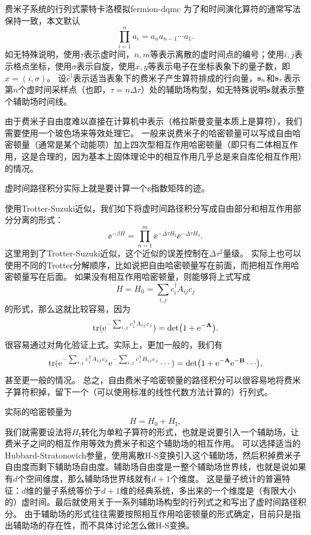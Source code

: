 \begin{back}{费米子系统的行列式蒙特卡洛模拟}{fermion-dqmc}
    为了和时间演化算符的通常写法保持一致，本文默认
    \[
        \prod_{i=1}^n a_i = a_n a_{n-1} \cdots a_1.
    \]
    如无特殊说明，使用$\tau$表示虚时间，$n, m$等表示离散的虚时间点的编号；使用$i, j$表示格点坐标，使用$\sigma$表示自旋，使用$x, y$等表示电子在坐标表象下的量子数，即$x=(i, \sigma)$。
    设$\hat{c}^\dagger$表示适当表象下的费米子产生算符排成的行向量，$\vb{s}_n$和$\vb{s}_\tau$表示第$n$个虚时间采样点（也即，$\tau=n\Delta \tau$）处的辅助场构型，如无特殊说明$\vb{s}$就表示整个辅助场时间线。

    由于费米子自由度难以直接在计算机中表示（格拉斯曼变量本质上是算符），我们需要使用一个玻色场来等效处理它。
    一般来说费米子的哈密顿量可以写成自由哈密顿量（通常是某个动能项）加上四次型相互作用哈密顿量（即只有二体相互作用，这是合理的，因为基本上固体理论中的相互作用几乎总是来自库伦相互作用）的情况。

    虚时间路径积分实际上就是要计算一个$\ee$指数矩阵的迹。
    
    使用Trotter-Suzuki近似，我们如下将虚时间路径积分写成自由部分和相互作用部分分离的形式：
    \[
        \ee^{-\beta {H}} = \prod_{n=1}^{m} \ee^{-\Delta \tau {H}_\text{I}} \ee^{-\Delta \tau {H}_0}.
    \]
    这里用到了Trotter-Suzuki近似，这个近似的误差控制在$\Delta \tau^2$量级。
    实际上也可以使用不同的Trotter分解顺序，比如说把自由哈密顿量写在前面，而把相互作用哈密顿量写在后面。
    如果没有相互作用哈密顿量，则能够将上式写成
    \[
        {H} = {H}_0 = \sum_{i, j} {c}_i^\dagger A_{ij} {c}_j
    \]
    的形式，那么这就比较容易，因为
    \begin{equation}
        \trace(\ee^{- \sum_{i, j} {c}_i^\dagger A_{ij} {c}_j}) = \det(1 + \ee^{- \vb{A}}).
    \end{equation}
    很容易通过对角化验证上式。实际上，更加一般的，我们有
    \begin{equation}
        \trace(\ee^{- \sum_{i, j} {c}_i^\dagger A_{ij} {c}_j} \ee^{- \sum_{i, j} {c}_i^\dagger B_{ij} {c}_j} \cdots) = \det(1 + \ee^{- \vb{A}}\ee^{- \vb{B}} \cdots),
        \label{eq:trace-to-det}
    \end{equation}
    甚至更一般的情况。
    总之，自由费米子哈密顿量的路径积分可以很容易地将费米子算符积掉，留下一个（可以使用标准的线性代数方法计算的）行列式。

    实际的哈密顿量为
    \[
        {H} = {H}_0 + {H}_\text{I}, 
    \]
    我们就需要设法将${H}_\text{I}$转化为单粒子算符的形式，也就是说要引入一个辅助场，让费米子之间的相互作用等效为费米子和这个辅助场的相互作用。
    可以选择适当的Hubbard-Stratonovich参量，使用离散H-S变换引入这个辅助场，然后积掉费米子自由度而剩下辅助场自由度。辅助场自由度是一整个辅助场世界线，也就是说如果有$d$个空间维度，那么辅助场世界线就有$d+1$个维度。
    这是量子统计的普遍特征：$d$维的量子系统等价于$d+1$维的经典系统，多出来的一个维度是（有限大小的）虚时间。最后就使用关于一系列辅助场构型的行列式之和写出了虚时间路径积分。
    由于辅助场的形式往往需要按照相互作用哈密顿量的形式确定，目前只是指出辅助场的存在性，而不具体讨论怎么做H-S变换。


\end{back}
